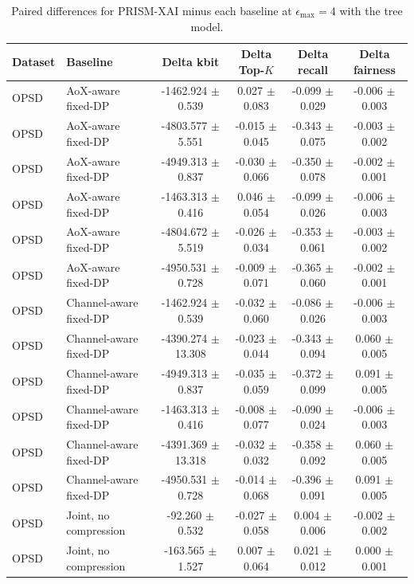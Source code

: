 \begin{table}[t]
\caption{Paired differences for PRISM-XAI minus each baseline at $\epsilon_{\max}=4$ with the tree model.}
\label{tab:paired-differences}
\centering
\scriptsize
\setlength{\tabcolsep}{3pt}
\begin{tabular}{llcccc}
\toprule
Dataset & Baseline & Delta kbit & Delta Top-$K$ & Delta recall & Delta fairness \\
\midrule
OPSD & AoX-aware fixed-DP & -1462.924 $\pm$ 0.539 & 0.027 $\pm$ 0.083 & -0.099 $\pm$ 0.029 & -0.006 $\pm$ 0.003 \\
OPSD & AoX-aware fixed-DP & -4803.577 $\pm$ 5.551 & -0.015 $\pm$ 0.045 & -0.343 $\pm$ 0.075 & -0.003 $\pm$ 0.002 \\
OPSD & AoX-aware fixed-DP & -4949.313 $\pm$ 0.837 & -0.030 $\pm$ 0.066 & -0.350 $\pm$ 0.078 & -0.002 $\pm$ 0.001 \\
OPSD & AoX-aware fixed-DP & -1463.313 $\pm$ 0.416 & 0.046 $\pm$ 0.054 & -0.099 $\pm$ 0.026 & -0.006 $\pm$ 0.003 \\
OPSD & AoX-aware fixed-DP & -4804.672 $\pm$ 5.519 & -0.026 $\pm$ 0.034 & -0.353 $\pm$ 0.061 & -0.003 $\pm$ 0.002 \\
OPSD & AoX-aware fixed-DP & -4950.531 $\pm$ 0.728 & -0.009 $\pm$ 0.071 & -0.365 $\pm$ 0.060 & -0.002 $\pm$ 0.001 \\
OPSD & Channel-aware fixed-DP & -1462.924 $\pm$ 0.539 & -0.032 $\pm$ 0.060 & -0.086 $\pm$ 0.026 & -0.006 $\pm$ 0.003 \\
OPSD & Channel-aware fixed-DP & -4390.274 $\pm$ 13.308 & -0.023 $\pm$ 0.044 & -0.343 $\pm$ 0.094 & 0.060 $\pm$ 0.005 \\
OPSD & Channel-aware fixed-DP & -4949.313 $\pm$ 0.837 & -0.035 $\pm$ 0.059 & -0.372 $\pm$ 0.099 & 0.091 $\pm$ 0.005 \\
OPSD & Channel-aware fixed-DP & -1463.313 $\pm$ 0.416 & -0.008 $\pm$ 0.077 & -0.090 $\pm$ 0.024 & -0.006 $\pm$ 0.003 \\
OPSD & Channel-aware fixed-DP & -4391.369 $\pm$ 13.318 & -0.032 $\pm$ 0.032 & -0.358 $\pm$ 0.092 & 0.060 $\pm$ 0.005 \\
OPSD & Channel-aware fixed-DP & -4950.531 $\pm$ 0.728 & -0.014 $\pm$ 0.068 & -0.396 $\pm$ 0.091 & 0.091 $\pm$ 0.005 \\
OPSD & Joint, no compression & -92.260 $\pm$ 0.532 & -0.027 $\pm$ 0.058 & 0.004 $\pm$ 0.006 & -0.002 $\pm$ 0.002 \\
OPSD & Joint, no compression & -163.565 $\pm$ 1.527 & 0.007 $\pm$ 0.064 & 0.021 $\pm$ 0.012 & 0.000 $\pm$ 0.001 \\

\end{tabular}
\end{table}
